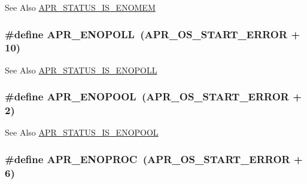\begin{DoxySeeAlso}{See Also}
\hyperlink{group___a_p_r___s_t_a_t_u_s___i_s_ga38ab0ab9f00c849f24aae626f5118fce}{A\-P\-R\-\_\-\-S\-T\-A\-T\-U\-S\-\_\-\-I\-S\-\_\-\-E\-N\-O\-M\-E\-M} 
\end{DoxySeeAlso}
\hypertarget{group___a_p_r___error_gaeff8d4ed7bf9b99cbe62a3e7068e85b7}{
\subsubsection[{A\-P\-R\-\_\-\-E\-N\-O\-P\-O\-L\-L}]{\setlength{\rightskip}{0pt plus 5cm}\#define A\-P\-R\-\_\-\-E\-N\-O\-P\-O\-L\-L~({\bf A\-P\-R\-\_\-\-O\-S\-\_\-\-S\-T\-A\-R\-T\-\_\-\-E\-R\-R\-O\-R} + 10)}}\label{group___a_p_r___error_gaeff8d4ed7bf9b99cbe62a3e7068e85b7}
\begin{DoxySeeAlso}{See Also}
\hyperlink{group___a_p_r___s_t_a_t_u_s___i_s_ga590bc2090fe120d142853dec27eaf9e8}{A\-P\-R\-\_\-\-S\-T\-A\-T\-U\-S\-\_\-\-I\-S\-\_\-\-E\-N\-O\-P\-O\-L\-L} 
\end{DoxySeeAlso}
\hypertarget{group___a_p_r___error_gaa8461873202e5e0b4c0ea261e05b07a9}{
\subsubsection[{A\-P\-R\-\_\-\-E\-N\-O\-P\-O\-O\-L}]{\setlength{\rightskip}{0pt plus 5cm}\#define A\-P\-R\-\_\-\-E\-N\-O\-P\-O\-O\-L~({\bf A\-P\-R\-\_\-\-O\-S\-\_\-\-S\-T\-A\-R\-T\-\_\-\-E\-R\-R\-O\-R} + 2)}}\label{group___a_p_r___error_gaa8461873202e5e0b4c0ea261e05b07a9}
\begin{DoxySeeAlso}{See Also}
\hyperlink{group___a_p_r___s_t_a_t_u_s___i_s_ga71f149437af305f0a0cabde2cc3f3b19}{A\-P\-R\-\_\-\-S\-T\-A\-T\-U\-S\-\_\-\-I\-S\-\_\-\-E\-N\-O\-P\-O\-O\-L} 
\end{DoxySeeAlso}
\hypertarget{group___a_p_r___error_ga18aa6d4ebaefda39478649c20bbeb9df}{
\subsubsection[{A\-P\-R\-\_\-\-E\-N\-O\-P\-R\-O\-C}]{\setlength{\rightskip}{0pt plus 5cm}\#define A\-P\-R\-\_\-\-E\-N\-O\-P\-R\-O\-C~({\bf A\-P\-R\-\_\-\-O\-S\-\_\-\-S\-T\-A\-R\-T\-\_\-\-E\-R\-R\-O\-R} + 6)}}\label{group___a_p_r___error_ga18aa6d4ebaefda39478649c20bbeb9df}
